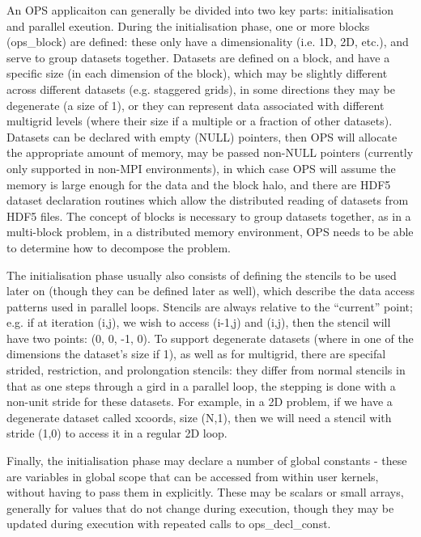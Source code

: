 \documentclass[11pt]{article}
\begin{document}
An OPS applicaiton can generally be divided into two key parts: initialisation and parallel exeution. During the 
initialisation phase, one or more blocks (ops\_block) are defined: these only have a dimensionality (i.e. 1D, 2D,
etc.), and serve to group datasets together. Datasets are defined on a block, and have a specific size (in each dimension of the block), which may be
slightly different across different datasets (e.g. staggered grids), in some directions they may be degenerate (a
 size of 1), or they can represent data associated with different multigrid levels (where their size if a multiple or
a fraction of other datasets). Datasets can be declared with empty (NULL) pointers, then OPS will allocate the appropriate
amount of memory, may be passed non-NULL pointers (currently only supported in non-MPI environments), in which case OPS will
assume the memory is large enough for the data and the block halo, and there are HDF5 dataset declaration routines which
allow the distributed reading of datasets from HDF5 files. The concept of blocks is necessary to group datasets together, 
as in a multi-block problem, in a distributed memory environment, OPS needs to be able to determine how to decompose the problem.

The initialisation phase usually also consists of defining the stencils to be used later on (though they can be defined later as well),
which describe the data access patterns used in parallel loops. Stencils are always relative to the ``current'' point; e.g. if
at iteration (i,j), we wish to access (i-1,j) and (i,j), then the stencil will have two points: (0, 0, -1, 0). To 
support degenerate datasets (where in one of the dimensions the dataset's size if 1), as well as for multigrid, there are
specifal strided, restriction, and prolongation stencils: they differ from normal stencils in that as one steps through a
gird in a parallel loop, the stepping is done with a non-unit stride for these datasets. For example, in a 2D problem, if
we have a degenerate dataset called xcoords, size (N,1), then we will need a stencil with stride (1,0) to access it in a
regular 2D loop.

Finally, the initialisation phase may declare a number of global constants - these are variables in global scope that can 
be accessed from within user kernels, without having to pass them in explicitly. These may be scalars or small arrays, 
generally for values that do not change during execution, though they may be updated during execution with repeated calls
to ops\_decl\_const. 
\end{document}
